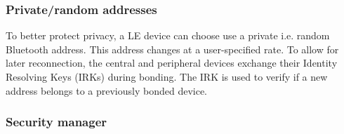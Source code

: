 \subsubsection{Private/random addresses}
To better protect privacy, a LE device can choose use a private i.e. random Bluetooth address. This address changes at a user-specified rate. To allow for later reconnection, the central and peripheral devices exchange their Identity Resolving Keys (IRKs) during bonding. The IRK is used to verify if a new address belongs to a previously bonded device.

\subsubsection{Security manager}
\label{section:security_manager}